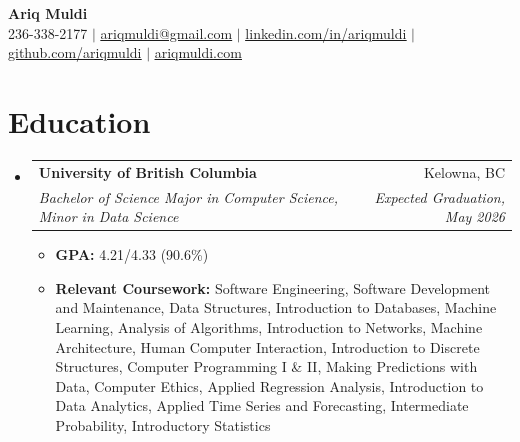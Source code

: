 \documentclass[letterpaper,11pt]{article}
\makeatletter
\newcommand{\resumeItem}[1]{
  \item\small{
    {#1 \vspace{-2pt}}
  }
}
\newcommand{\resumeSubheading}[4]{
  \vspace{-2pt}\item
    \begin{tabular*}{0.97\textwidth}[t]{l@{\extracolsep{\fill}}r}
      \textbf{#1} & #2 \\
      \textit{\small#3} & \textit{\small #4} \\
    \end{tabular*}\vspace{-7pt}
}
\newcommand{\resumeSubHeadingListStart}{\begin{itemize}[leftmargin=0.15in, label={}]}
\newcommand{\resumeSubHeadingListEnd}{\end{itemize}}
\newcommand{\resumeItemListStart}{\begin{itemize}}
\newcommand{\resumeItemListEnd}{\end{itemize}\vspace{-5pt}}
\makeatother
\begin{document}

\newcommand{\githubLink}[1]{\href{#1}{\textcolor{black}{\faGithub}}}

\begin{center}
	\textbf{\huge Ariq Muldi} \\ \vspace{1pt}
	\small 236-338-2177 $|$ \href{mailto:ariqmuldi@gmail.com}{\textcolor{sectionblue}{\underline{ariqmuldi@gmail.com}}} $|$ 
	\href{https://linkedin.com/in/ariqmuldi}{\textcolor{sectionblue}{\underline{linkedin.com/in/ariqmuldi}}} $|$
	\href{https://github.com/ariqmuldi}{\textcolor{sectionblue}{\underline{github.com/ariqmuldi}}} $|$
	\href{https://ariqmuldi.com}{\textcolor{sectionblue}{\underline{ariqmuldi.com}}}
\end{center}

\section{Education}
\resumeSubHeadingListStart
\resumeSubheading
{University of British Columbia}{\textcolor{sectionblue}{Kelowna, BC}}
{Bachelor of Science Major in Computer Science, Minor in Data Science}{Expected Graduation, May 2026}

\resumeItemListStart
\resumeItem{\textbf{GPA:} 4.21/4.33 (90.6\%)}

\resumeItem{\textbf{Relevant Coursework:} Software Engineering, Software Development and Maintenance, Data Structures,  Introduction to Databases, Machine Learning, Analysis of Algorithms, Introduction to Networks, Machine Architecture, Human Computer Interaction, Introduction to Discrete Structures, Computer Programming I \& II, Making Predictions with Data, Computer Ethics, Applied Regression Analysis, Introduction to Data Analytics, Applied Time Series and Forecasting, Intermediate Probability, Introductory Statistics}
\resumeItemListEnd

\resumeSubHeadingListEnd
\end{document}
